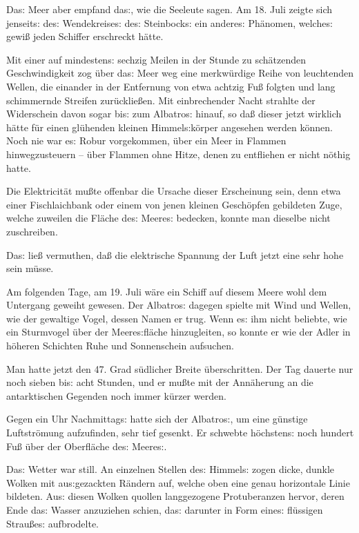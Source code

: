 \documentclass[oneside,12pt]{book}
\newcommand{\s}{s:}
\begin{document}
Da{\s} Meer aber {\glqq}empfand da{\s}{\grqq}, wie die Seeleute
sagen. Am 18. Juli zeigte sich jenseit{\s} de{\s} Wendekreise{\s}
de{\s} Steinbock{\s} ein andere{\s} Ph\"anomen, welche{\s} gewi{\ss}
jeden Schiffer erschreckt h\"atte.

Mit einer auf mindesten{\s} sechzig Meilen in der Stunde zu
sch\"atzenden Geschwindigkeit zog \"uber da{\s} Meer weg eine
merkw\"urdige Reihe von leuchtenden Wellen, die einander in der
Entfernung von etwa acht\/zig Fu{\ss} folgten und lang schimmernde
Streifen zur\"ucklie{\ss}en. Mit einbrechender Nacht strahlte der
Widerschein davon sogar bi{\s} zum {\glqq}Albatro{\s}{\grqq} hinauf,
so da{\ss} dieser jetzt wirklich h\"atte f\"ur einen gl\"uhenden
kleinen Himmel{\s}k\"orper angesehen werden k\"onnen. Noch nie war
e{\s} Robur vorgekommen, \"uber ein Meer in Flammen hinwegzusteuern
-- \"uber Flammen ohne Hitze, denen zu entfliehen er nicht n\"othig
hatte.

Die Elektricit\"at mu{\ss}te offenbar die Ursache dieser Erscheinung
sein, denn etwa einer Fischlaichbank oder einem von jenen kleinen
Gesch\"opfen gebildeten Zuge, welche zuweilen die Fl\"ache de{\s}
Meere{\s} bedecken, konnte man dieselbe nicht zuschreiben.

Da{\s} lie{\ss} vermuthen, da{\ss} die elektrische Spannung der Luft
jetzt eine sehr hohe sein m\"usse.

Am folgenden Tage, am 19. Juli w\"are ein Schiff auf diesem Meere
wohl dem Untergang geweiht gewesen. Der {\glqq}Albatro{\s}{\grqq}
dagegen spielte mit Wind und Wellen, wie der gewaltige Vogel, dessen
Namen er trug. Wenn e{\s} ihm nicht beliebte, wie ein Sturmvogel
\"uber der Meere{\s}fl\"ache hinzugleiten, so konnte er wie der Adler
in h\"oheren Schichten Ruhe und Sonnenschein aufsuchen.

Man hatte jetzt den 47. Grad s\"udlicher Breite \"uberschritten. Der
Tag dauerte nur noch sieben bi{\s} acht Stunden, und er mu{\ss}te mit
der Ann\"aherung an die antarktischen Gegenden noch immer k\"urzer
werden.

Gegen ein Uhr Nachmittag{\s} hatte sich der {\glqq}Albatro{\s}{\grqq},
um eine g\"unstige Luftstr\"omung aufzufinden, sehr tief gesenkt. Er
schwebte h\"ochsten{\s} noch hundert Fu{\ss} \"uber der Oberfl\"ache
de{\s} Meere{\s}.

Da{\s} Wetter war still. An einzelnen Stellen de{\s} Himmel{\s} zogen
dicke, dunkle Wolken mit au{\s}gezackten R\"andern auf, welche oben
eine genau horizontale Linie bildeten. Au{\s} diesen Wolken quollen
langgezogene Protuberanzen hervor, deren Ende da{\s} Wasser
anzuziehen schien, da{\s} darunter in Form eine{\s} fl\"ussigen
Strau{\ss}e{\s} aufbrodelte.
\end{document}
